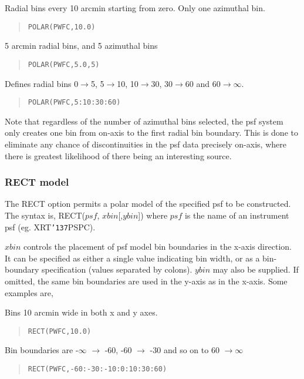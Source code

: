 \documentclass{book}
\renewcommand{\_}{{\tt\char'137}}     %
\begin{document}
Radial bins every 10 arcmin starting from zero. Only one azimuthal bin.
\begin{quote}\begin{verbatim}
POLAR(PWFC,10.0)
\end{verbatim}\end{quote}
5 arcmin radial bins, and 5 azimuthal bins
\begin{quote}\begin{verbatim}
POLAR(PWFC,5.0,5)
\end{verbatim}\end{quote}
Defines radial bins 0$\rightarrow$5, 5$\rightarrow$10, 10$\rightarrow$30, 30$\rightarrow$60 and 60$\rightarrow$$\infty$.
\begin{quote}\begin{verbatim}
POLAR(PWFC,5:10:30:60)
\end{verbatim}\end{quote}
Note that regardless of the number of azimuthal bins selected,
the psf system only creates one bin from on-axis to the first
radial bin boundary. This is done to eliminate any chance of
discontinuities in the psf data precisely on-axis, where there
is greatest likelihood of there being an interesting source.
 
\subsubsection{RECT model}
The RECT option permits a polar model of the specified psf
to be constructed. The syntax is, RECT($psf$, $xbin$[,$ybin$])
where $psf$ is the name of an instrument psf (eg. XRT\_PSPC).
 
$xbin$ controls the placement of psf model bin boundaries in the
x-axis direction. It can be specified as either a single value
indicating bin width, or as a bin-boundary specification (values
separated by colons). $ybin$ may also be supplied. If omitted,
the same bin boundaries are used in the y-axis as in the x-axis.
Some examples are,
 
Bins 10 arcmin wide in both x and y axes.
\begin{quote}\begin{verbatim}
RECT(PWFC,10.0)
\end{verbatim}\end{quote}
Bin boundaries are -$\infty$ $\rightarrow$ -60, -60 $\rightarrow$ -30 and so on to 60 $\rightarrow$$\infty$
\begin{quote}\begin{verbatim}
RECT(PWFC,-60:-30:-10:0:10:30:60)
\end{verbatim}\end{quote}
\end{document}
